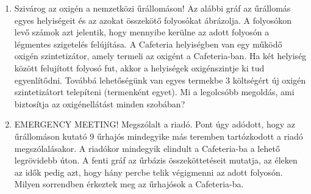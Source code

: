\documentclass[a4paper,12pt]{article}
\begin{document}
        \noindent{}
        \noindent{}
        \begin{enumerate}

            \item Szivárog az oxigén a nemzetközi űrállomáson! Az alábbi gráf az űrállomás egyes helyiségeit és az azokat összekötő folyosókat ábrázolja. A folyosókon levő számok azt jelentik, hogy mennyibe kerülne az adott folyosón a légmentes szigetelés felújítása. A Cafeteria helyiségben van egy működő oxigén szintetizátor, amely termeli az oxigént a Cafeteria-ban. Ha két helyiség között felujított folyosó fut, akkor a helyiségek oxigénszintje ki tud egyenlítődni. Továbbá lehetőségünk van egyes termekbe $3$ költségért új oxigén szintetizátort telepíteni (termenként egyet). Mi a legolcsóbb megoldás, ami biztosítja az oxigénellátást minden szobában?
            \begin{figure}[!h]
                    \centering
                    
            \end{figure}

            \item EMERGENCY MEETING! Megszólalt a riadó. Pont úgy adódott, hogy az űrállomáson kutató $9$ űrhajós mindegyike más teremben tartózkodott a riadó megszólalásakor. A riadókor mindegyik elindult a Cafeteria-ba a lehető legrövidebb úton. A fenti gráf az űrbázis összeköttetéseit mutatja, az éleken az idők pedig azt, hogy hány percbe telik végigmenni az adott folyosón. Milyen sorrendben érkeztek meg az űrhajósok a Cafeteria-ba.
        \end{enumerate}
    
\end{document}

